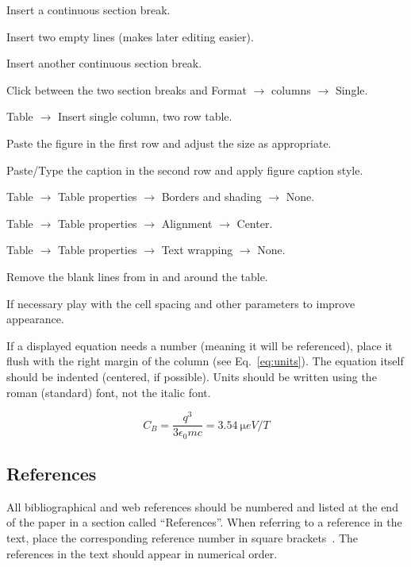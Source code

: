 \documentclass[a4paper]{jacow}
\begin{document}
\begin{Itemize}
\item	Insert a continuous section break.
\item	Insert two empty lines (makes later editing easier).
\item	Insert another continuous section break.
\item	Click between the two section breaks and Format $\rightarrow$ columns $\rightarrow$ Single.
\item	Table $\rightarrow$ Insert single column, two row table.
\item	Paste the figure in the first row and adjust the size as appropriate.
\item	Paste/Type the caption in the second row and apply figure caption style.
\item	Table $\rightarrow$ Table properties $\rightarrow$ Borders and shading $\rightarrow$ None.
\item	Table $\rightarrow$ Table properties $\rightarrow$ Alignment $\rightarrow$ Center.
\item	Table $\rightarrow$ Table properties $\rightarrow$ Text wrapping $\rightarrow$ None.
\item	Remove the blank lines from in and around the table.
\item	If necessary play with the cell spacing and other parameters to improve appearance.
\end{Itemize}

If a displayed equation needs a number (meaning it will be referenced), place it flush with the right
margin of the column (see Eq.~\ref{eq:units}). The equation itself should be indented (centered, if possible).
Units should be written
using the roman (standard) font, not the italic font.

\begin{equation}\label{eq:units}
    C_B=\frac{q^3}{3\epsilon_{0} mc}=\SI{3.54}{\micro eV/T}
\end{equation}

\subsection{References}

All bibliographical and web references should be numbered and listed at the
end of the paper in a section called \enquote{References}. When referring to a
reference in the text, place the corresponding reference number in square
brackets~\cite{exampl-ref}. The references in the text should appear in numerical
order.
\end{document}
